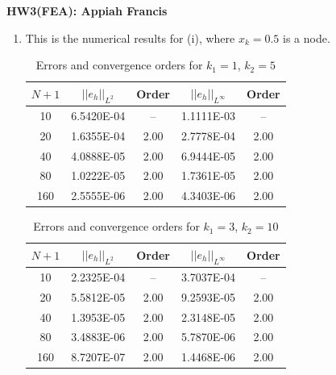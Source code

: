 \documentclass[11pt]{article}      %
\begin{document}

\begin{center}
{\bf\large HW3(FEA): Appiah Francis}\\
\vspace{0.05in}
\end{center}
\begin{enumerate}
\item[I(iii)] This is the numerical results for (i), where $x_k=0.5$ is a node.
\begin{table}[!h]
	\caption{Errors and convergence orders for $k_1=1$, $k_2=5$}
	\vspace{0.1in}
	\centering
	\begin{tabular}{|c|c|c|c|c|}
		\hline
		$N+1$ & $||e_h||_{L^2}$ & Order & $||e_h||_{L^\infty}$ & Order \\
		\hline
		10  & 6.5420E-04 & --   & 1.1111E-03 & --   \\
		20  & 1.6355E-04 & 2.00 & 2.7778E-04 & 2.00 \\
		40  & 4.0888E-05 & 2.00 & 6.9444E-05 & 2.00 \\
		80  & 1.0222E-05 & 2.00 & 1.7361E-05 & 2.00 \\
		160 & 2.5555E-06 & 2.00 & 4.3403E-06 & 2.00 \\
		\hline
	\end{tabular}
	\label{tab:k1_1_k2_5}
\end{table}
\begin{table}[!h]
	\caption{Errors and convergence orders for $k_1=3$, $k_2=10$}
	\vspace{0.1in}
	\centering
	\begin{tabular}{|c|c|c|c|c|}
		\hline
		$N+1$ & $||e_h||_{L^2}$ & Order & $||e_h||_{L^\infty}$ & Order \\
		\hline
		10  & 2.2325E-04 & --   & 3.7037E-04 & --   \\
		20  & 5.5812E-05 & 2.00 & 9.2593E-05 & 2.00 \\
		40  & 1.3953E-05 & 2.00 & 2.3148E-05 & 2.00 \\
		80  & 3.4883E-06 & 2.00 & 5.7870E-06 & 2.00 \\
		160 & 8.7207E-07 & 2.00 & 1.4468E-06 & 2.00 \\
		\hline
	\end{tabular}
	\label{tab:k1_3_k2_10}
\end{table}
\begin{table}[!h]
	\caption{Errors and convergence orders for $k_1=5$, $k_2=9$}

\end{table}
\end{enumerate}
\end{document}
